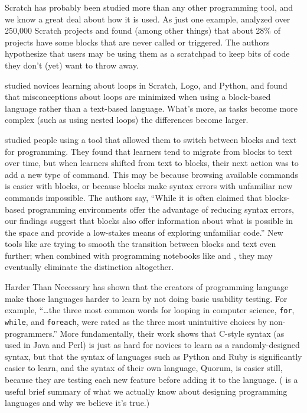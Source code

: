 
Scratch has probably been studied more than any other programming tool, and we know a great deal about how it is used. As just one example, \cite{Aiva2016} analyzed over 250,000 Scratch projects and found (among other things) that about 28\% of projects have some blocks that are never called or triggered. The authors hypothesize that users may be using them as a scratchpad to keep bits of code they don't (yet) want to throw away.

\cite{Grov2017,Mlad2017} studied novices learning about loops in Scratch, Logo, and Python, and found that misconceptions about loops are minimized when using a block-based language rather than a text-based language. What's more, as tasks become more complex (such as using
nested loops) the differences become larger.

\cite{Wein2017a} studied people using a tool that allowed them to switch between blocks and text for programming. They found that learners tend to migrate from blocks to text over time, but when learners shifted from text to blocks, their next action was to add a new type of command. This may be because browsing available commands is easier with blocks, or because blocks make syntax errors with unfamiliar new commands impossible. The authors say, ``While it is often claimed that blocks-based programming environments offer the advantage of reducing syntax errors, our findings suggest that blocks also offer information about what is possible in the space and provide a low-stakes means of exploring unfamiliar code.'' New tools like  are trying to smooth the transition between blocks and text even further; when combined with programming notebooks like  and , they may eventually eliminate the distinction altogether.

\begin{aside}{Harder Than Necessary}
  \cite{Stef2013} has shown that the creators of programming language make those languages harder to learn by not doing basic usability testing. For example, ``{\ldots}the three most common words for looping in computer science, \texttt{for}, \texttt{while}, and \texttt{foreach}, were rated as the three most unintuitive choices by non-programmers.'' More fundamentally, their work shows that C-style syntax (as used in Java and Perl) is just as hard for novices to learn as a randomly-designed syntax, but that the syntax of languages such as Python and Ruby is significantly easier to learn, and the syntax of their own language, Quorum, is easier still, because they are testing each new feature before adding it to the language. (\cite{Stef2017} is a useful brief summary of what we actually know about designing programming languages and why we believe it's true.)
\end{aside}

